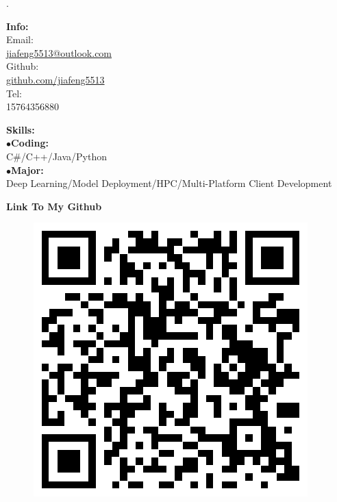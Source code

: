 \documentclass[a4paper,12pt,final]{memoir}
\newcommand{\myThemeColor}{RoyalBlue}
\newcommand{\SmallSep}{\vspace{0.9em}}
\newcommand{\CVItem}[1]
	{\textbf{\color{\myThemeColor} #1}}
\begin{document}
\begin{flushright}\footnotesize
.\\
\vskip 6cm
    \raggedright
	\CVItem{{\large Info:}}\\
	Email:\\
	\href{mailto:jiafeng5513@outlook.com}{jiafeng5513@outlook.com}  \\
	Github:\\
	\href{github.com/jiafeng5513}{github.com/jiafeng5513} \\
	Tel:\\
	15764356880
	\SmallSep
	\SmallSep

	\CVItem{{\large Skills:}}\\
	$\bullet$\textbf{Coding:}\\ C\#/C++/Java/Python\\
	$\bullet$\textbf{Major:}\\ Deep Learning/Model Deployment/HPC/Multi-Platform Client Development \\

	\SmallSep
	\SmallSep
	\SmallSep
	
	\CVItem{\large Link To My Github}
	\begin{figure}[h]
		\centering
		\includegraphics[width=0.8\columnwidth]{../img/Github.png}
	\end{figure}
	

\end{flushright}\normalsize
\framebreak
\end{document}
